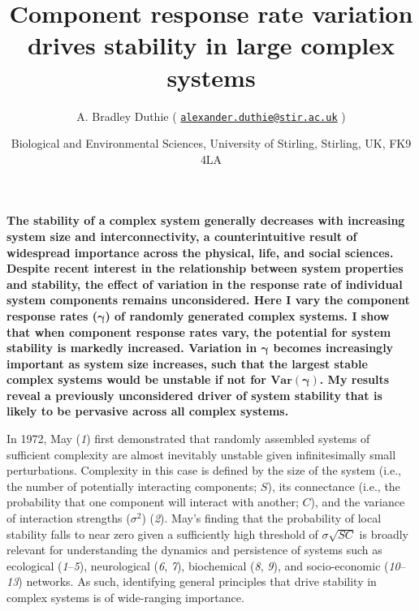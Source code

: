 \documentclass[]{article}
\title{Component response rate variation drives stability in large complex
systems}
\author{A. Bradley Duthie (
\href{mailto:alexander.duthie@stir.ac.uk}{\nolinkurl{alexander.duthie@stir.ac.uk}}
)}
\date{Biological and Environmental Sciences, University of Stirling, Stirling,
UK, FK9 4LA}
\begin{document}
\maketitle

\textbf{The stability of a complex system generally decreases with
increasing system size and interconnectivity, a counterintuitive result
of widespread importance across the physical, life, and social sciences.
Despite recent interest in the relationship between system properties
and stability, the effect of variation in the response rate of
individual system components remains unconsidered. Here I vary the
component response rates (\(\boldsymbol{\gamma}\)) of randomly generated
complex systems. I show that when component response rates vary, the
potential for system stability is markedly increased. Variation in
\(\boldsymbol{\gamma}\) becomes increasingly important as system size
increases, such that the largest stable complex systems would be
unstable if not for \(\boldsymbol{Var(\gamma)}\). My results reveal a
previously unconsidered driver of system stability that is likely to be
pervasive across all complex systems.}

In 1972, May (\emph{1}) first demonstrated that randomly assembled
systems of sufficient complexity are almost inevitably unstable given
infinitesimally small perturbations. Complexity in this case is defined
by the size of the system (i.e., the number of potentially interacting
components; \(S\)), its connectance (i.e., the probability that one
component will interact with another; \(C\)), and the variance of
interaction strengths (\(\sigma^{2}\)) (\emph{2}). May's finding that
the probability of local stability falls to near zero given a
sufficiently high threshold of \(\sigma\sqrt{SC}\) is broadly relevant
for understanding the dynamics and persistence of systems such as
ecological (\emph{1}--\emph{5}), neurological (\emph{6}, \emph{7}),
biochemical (\emph{8}, \emph{9}), and socio-economic
(\emph{10}--\emph{13}) networks. As such, identifying general principles
that drive stability in complex systems is of wide-ranging importance.
\end{document}
